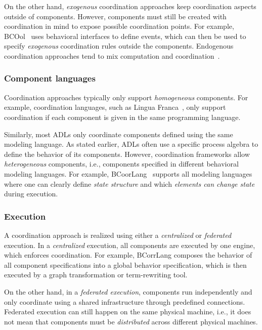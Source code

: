 \documentclass[runningheads]{llncs}
\begin{document}
On the other hand, \textit{exogenous} coordination approaches keep coordination aspects outside of components.
However, components must still be created with coordination in mind to expose possible coordination points.
For example, BCOol~\cite{varalarsenBehavioralCoordinationOperator2015} uses behavioral interfaces to define events, which can then be used to specify \textit{exogenous} coordination rules outside the components.
Endogenous coordination approaches tend to mix computation and coordination~\cite{arbabWhatYouMean1998}.

\subsubsection{Component languages} Coordination approaches typically only support \textit{homogeneous} components.
For example, coordination languages, such as Lingua Franca~\cite{lohstrohReactorsDeterministicModel2020}, only support coordination if each component is given in the same programming language.

Similarly, most ADLs only coordinate components defined using the same modeling language.
As stated earlier, ADLs often use a specific process algebra to define the behavior of its components.
However, coordination frameworks allow \textit{heterogeneous} components, i.e., components specified in different behavioral modeling languages.
For example, BCoorLang~\cite{krauterBehavioralConsistencyMultimodeling2023} supports all modeling languages where one can clearly define \textit{state structure} and which \textit{elements can change state} during execution.

\subsubsection{Execution} A coordination approach is realized using either a \textit{centralized} or \textit{federated} execution.
In a \textit{centralized} execution, all components are executed by one engine, which enforces coordination.
For example, BCorrLang composes the behavior of all component specifications into a global behavior specification, which is then executed by a graph transformation or term-rewriting tool.

On the other hand, in a \textit{federated execution}, components run independently and only coordinate using a shared infrastructure through predefined connections.
Federated execution can still happen on the same physical machine, i.e., it does not mean that components must be \textit{distributed} across different physical machines. 
\end{document}
